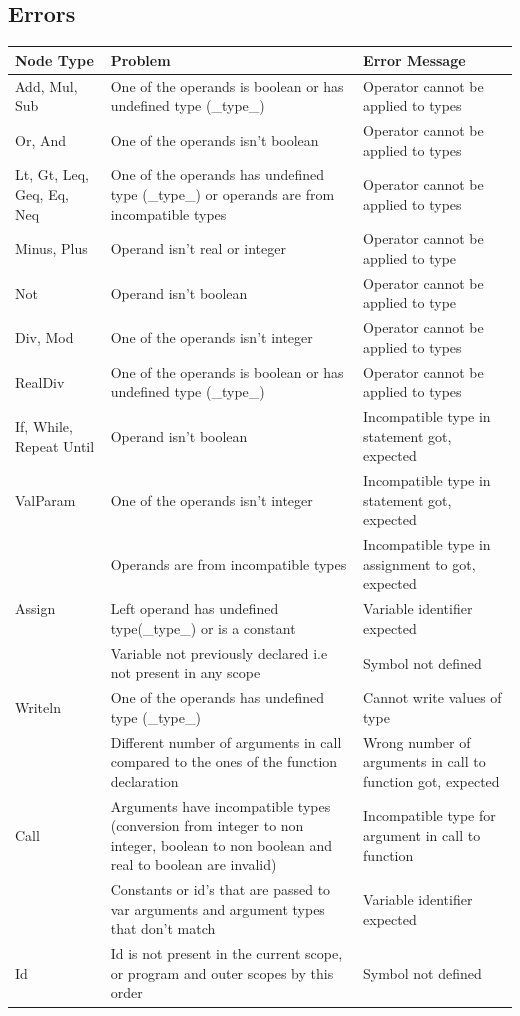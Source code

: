 \documentclass[12pt]{article}
\begin{document}
\subsection{Errors}


\begin{longtable} {|p{3.0cm} | p{8cm} | p{4.0cm}|} 
 \textbf{Node Type} 	& \textbf{Problem} & \textbf{Error Message} \\ \hline
	Add, Mul, Sub 		& One of the operands is boolean or has undefined type (\_type\_) & Operator cannot be applied to types \\ \hline
	Or, And 			& One of the operands isn't boolean & Operator cannot be applied to types \\ \hline
	Lt, Gt, Leq, Geq, Eq, Neq &		One of the operands has undefined type (\_type\_) or operands are from incompatible types & Operator cannot be applied to types \\ \hline
	Minus, Plus 		& Operand isn't real or integer & Operator cannot be applied to type \\ \hline
	Not 				& Operand isn't boolean & Operator cannot be applied to type \\ \hline
	Div, Mod 			& One of the operands isn't integer & Operator cannot be applied to types \\ \hline
	RealDiv				& One of the operands is boolean or has undefined type (\_type\_) & Operator cannot be applied to types \\ \hline
	If, While, Repeat Until & Operand isn't boolean & Incompatible type in statement got, expected \\ \hline
	ValParam 			& One of the operands isn't integer & Incompatible type in statement got, expected \\ \hline
	\multirow{3}{*}{Assign} & Operands are from incompatible types & Incompatible type in assignment to got, expected \\ \cline{2-3}
							& Left operand has undefined type(\_type\_) or is a constant & Variable identifier expected \\ \cline{2-3}
							& Variable not previously declared i.e not present in any scope & Symbol not defined \\ \hline
	Writeln 			& One of the operands has undefined type (\_type\_) & Cannot write values of type \\ \hline
	\multirow{3}{*}{Call} 	& Different number of arguments in call compared to the ones of the function declaration & Wrong number of arguments in call to function got, expected \\ \cline{2-3}
	 					& Arguments have incompatible types (conversion from integer to non integer, boolean to non boolean and real to boolean are invalid) & Incompatible type for argument in call to function  \\ \cline{2-3}
						& Constants or id's that are passed to var arguments and argument types that don't match & Variable identifier expected  \\ \hline
	Id 					& Id is not present in the current scope, or program and outer scopes by this order & Symbol not defined  \\ \hline

\end{longtable}
\end{document}
